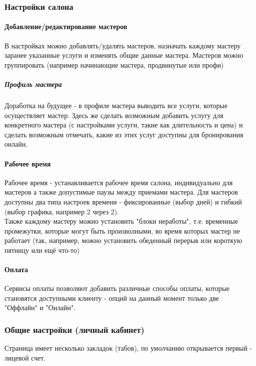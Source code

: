 \documentclass[DIV=calc, paper=a4, fontsize=11pt]{scrartcl} %
\begin{document}
\subsubsection{Настройки салона}

\paragraph{Добавление/редактирование мастеров}
В настройках можно добавлять/удалять мастеров, назначать каждому мастеру заранее указанные услуги и изменять общие данные мастера. Мастеров можно группировать (например начинающие мастера, продвинутые или профи)

\subparagraph{Профиль мастера} \label{subparagraph:masters_profile}
Доработка на будущее - в профиле мастера выводить все услуги, которые осуществляет мастер. Здесь же сделать возможным добавить услугу для конкретного мастера (с настройками услуги, такие как длительность и цена) и сделать возможным отмечать, какие из этих услуг доступны для бронирования онлайн.

\paragraph{Рабочее время}

Рабочее время - устанавливается рабочее время салона, индивидуально для мастеров а также допустимые паузы между приемами мастера. Для мастеров доступны два типа настроек времени - фиксированные (выбор дней) и гибкий (выбор графика, например 2 через 2).
\\[0.5cm]
Также каждому мастеру можно установить "блоки неработы", т.е. временные промежутки, которые могут быть произволными, во время которых мастер не работает (так, например, можно установить обеденный перерыв или короткую пятницу или ещё что-то)

\paragraph{Оплата}
Сервисы оплаты позволяют добавить различные способы оплаты, которые становятся доступными клиенту - опций на данный момент только две "Оффлайн" и "Онлайн". 

\subsubsection{Общие настройки (личный кабинет)}
Страница имеет несколько закладок (табов), по умолчанию открывается первый - лицевой счет.
\end{document}
